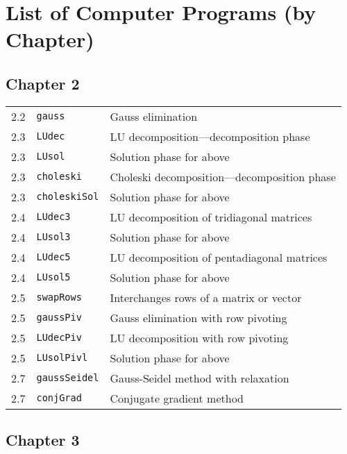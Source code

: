                       


\section{List of Computer Programs (by Chapter)}

\subsection{Chapter 2}

\begin{tabular}{lll}
2.2 & \texttt{gauss} & Gauss elimination \\ 
2.3 & \texttt{LUdec} & LU decomposition---decomposition phase \\ 
2.3 & \texttt{LUsol} & Solution phase for above \\ 
2.3 & \texttt{choleski} & Choleski decomposition---decomposition phase \\ 
2.3 & \texttt{choleskiSol} & Solution phase for above \\ 
2.4 & \texttt{LUdec3} & LU decomposition of tridiagonal matrices \\ 
2.4 & \texttt{LUsol3} & Solution phase for above \\ 
2.4 & \texttt{LUdec5} & LU decomposition of pentadiagonal matrices \\ 
2.4 & \texttt{LUsol5} & Solution phase for above \\ 
2.5 & \texttt{swapRows} & Interchanges rows of a matrix or vector \\ 
2.5 & \texttt{gaussPiv} & Gauss elimination with row pivoting \\ 
2.5 & \texttt{LUdecPiv} & LU decomposition with row pivoting \\ 
2.5 & \texttt{LUsolPivl} & Solution phase for above \\ 
2.7 & \texttt{gaussSeidel} & Gauss-Seidel method with relaxation \\ 
2.7 & \texttt{conjGrad} & Conjugate gradient method%
\end{tabular}

\subsection{Chapter 3}

